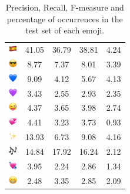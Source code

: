 \documentclass{article}
\begin{document}
\begin{table}
\begin{tabular}{|c|ccc|c|}
\includegraphics[height=0.37cm,width=0.37cm]{img/Spain.png} & 41.05 & 36.79 & 38.81 & 4.24\\ 
\includegraphics[height=0.37cm,width=0.37cm]{img/smiling_face_with_sunglasses.png} & 8.77 & 7.37 & 8.01 & 3.39\\ 
\includegraphics[height=0.37cm,width=0.37cm]{img/blue_heart.png} & 9.09 & 4.12 & 5.67 & 4.13\\ 
\includegraphics[height=0.37cm,width=0.37cm]{img/purple_heart.png} & 3.43 & 2.55 & 2.93 & 2.35\\ 
\includegraphics[height=0.37cm,width=0.37cm]{img/winking_face_with_tongue.png} & 4.37 & 3.65 & 3.98 & 2.74\\ 
\includegraphics[height=0.37cm,width=0.37cm]{img/revolving_hearts.png} & 4.41 & 3.23 & 3.73 & 0.93\\ 
\includegraphics[height=0.37cm,width=0.37cm]{img/sparkles.png} & 13.93 & 6.73 & 9.08 & 4.16\\ 
\includegraphics[height=0.37cm,width=0.37cm]{img/musical_notes.png} & 14.84 & 17.92 & 16.24 & 2.12\\ 
\includegraphics[height=0.37cm,width=0.37cm]{img/heart_with_arrow.png} & 3.95 & 2.24 & 2.86 & 1.34\\ 
\includegraphics[height=0.37cm,width=0.37cm]{img/beaming_face_with_smiling_eyes.png} & 2.48 & 3.35 & 2.85 & 2.09\\ 

\hline
\end{tabular}
\caption{\label{table:emoji_detailed} Precision, Recall, F-measure and percentage of occurrences in the test set of each emoji.}
\end{table}
\end{document}
